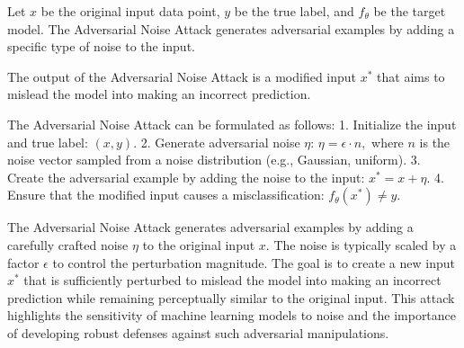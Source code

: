 Let \( x \) be the original input data point, \( y \) be the true label, and \( f_{\theta} \) be the target model. The Adversarial Noise Attack generates adversarial examples by adding a specific type of noise to the input.

The output of the Adversarial Noise Attack is a modified input \( x^* \) that aims to mislead the model into making an incorrect prediction.

The Adversarial Noise Attack can be formulated as follows:
1. Initialize the input and true label:
   $
   (x, y).
   $
2. Generate adversarial noise \( \eta \):
   $
   \eta = \epsilon \cdot n,
   $
   where \( n \) is the noise vector sampled from a noise distribution (e.g., Gaussian, uniform).
3. Create the adversarial example by adding the noise to the input:
   $
   x^* = x + \eta.
   $
4. Ensure that the modified input causes a misclassification:
   $
   f_{\theta}(x^*) \neq y.
   $

The Adversarial Noise Attack generates adversarial examples by adding a carefully crafted noise \( \eta \) to the original input \( x \). The noise is typically scaled by a factor \( \epsilon \) to control the perturbation magnitude. The goal is to create a new input \( x^* \) that is sufficiently perturbed to mislead the model into making an incorrect prediction while remaining perceptually similar to the original input. This attack highlights the sensitivity of machine learning models to noise and the importance of developing robust defenses against such adversarial manipulations.
